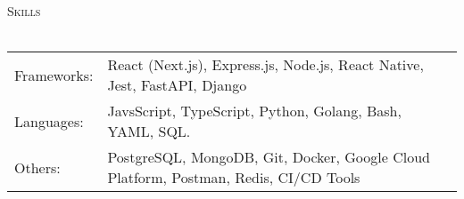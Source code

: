 \documentclass[a4paper]{article}
\newcommand{\lineunder} {
    \vspace*{-8pt} \\
    \hspace*{-12pt} \hrulefill \\
}
\newcommand{\header} [1] {
    {\hspace*{-12pt}\vspace*{6pt} \large\textsc{#1}}
    \vspace*{-6pt} \lineunder
}
\begin{document}
\header{Skills}
\vspace{1mm}
\begin{tabular}{ l l }
	Frameworks: & React (Next.js), Express.js, Node.js, React Native, Jest, FastAPI, Django              \\
	Languages:  & JavsScript, TypeScript, Python, Golang, Bash, YAML, SQL.                               \\
	Others:     & PostgreSQL, MongoDB, Git, Docker, Google Cloud Platform, Postman, Redis, CI/CD Tools   \\
\end{tabular}
\end{document}
